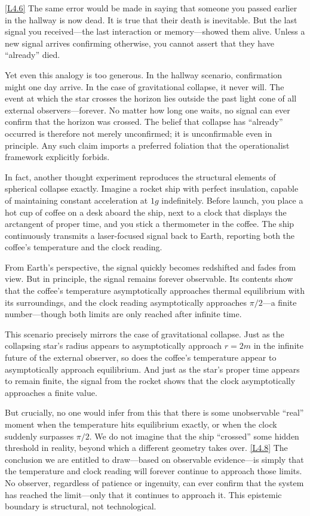 \documentclass[12pt]{book}
\newcounter{logicanchor}
\newenvironment{logicanchorenv}[1]{\refstepcounter{logicanchor}\label{#1}}{}
\newcommand{\logiclink}[2]{\begin{logicanchorenv}{logic:#1}\end{logicanchorenv}\hyperref[appendix:#1]{[#1]}\xspace}
\begin{document}
\logiclink{L4.6}{} The same error would be made in saying that someone you passed earlier in the hallway is now dead. It is true that their death is inevitable. But the last signal you received---the last interaction or memory---showed them alive. Unless a new signal arrives confirming otherwise, you cannot assert that they have ``already'' died.

Yet even this analogy is too generous. In the hallway scenario, confirmation might one day arrive. In the case of gravitational collapse, it never will. The event at which the star crosses the horizon lies outside the past light cone of all external observers---forever. No matter how long one waits, no signal can ever confirm that the horizon was crossed. The belief that collapse has ``already'' occurred is therefore not merely unconfirmed; it is unconfirmable even in principle. Any such claim imports a preferred foliation that the operationalist framework explicitly forbids.

In fact, another thought experiment reproduces the structural elements of spherical collapse exactly. Imagine a rocket ship with perfect insulation, capable of maintaining constant acceleration at $1g$ indefinitely. Before launch, you place a hot cup of coffee on a desk aboard the ship, next to a clock that displays the arctangent of proper time, and you stick a thermometer in the coffee. The ship continuously transmits a laser-focused signal back to Earth, reporting both the coffee's temperature and the clock reading.

From Earth's perspective, the signal quickly becomes redshifted and fades from view. But in principle, the signal remains forever observable. Its contents show that the coffee's temperature asymptotically approaches thermal equilibrium with its surroundings, and the clock reading asymptotically approaches $\pi/2$---a finite number---though both limits are only reached after infinite time.

This scenario precisely mirrors the case of gravitational collapse. Just as the collapsing star's radius appears to asymptotically approach $r = 2m$ in the infinite future of the external observer, so does the coffee's temperature appear to asymptotically approach equilibrium. And just as the star's proper time appears to remain finite, the signal from the rocket shows that the clock asymptotically approaches a finite value.

But crucially, no one would infer from this that there is some unobservable ``real'' moment when the temperature hits equilibrium exactly, or when the clock suddenly surpasses $\pi/2$. We do not imagine that the ship ``crossed'' some hidden threshold in reality, beyond which a different geometry takes over. \logiclink{L4.8}{} The conclusion we are entitled to draw---based on observable evidence---is simply that the temperature and clock reading will forever continue to approach those limits. No observer, regardless of patience or ingenuity, can ever confirm that the system has reached the limit---only that it continues to approach it. This epistemic boundary is structural, not technological.
\end{document}
